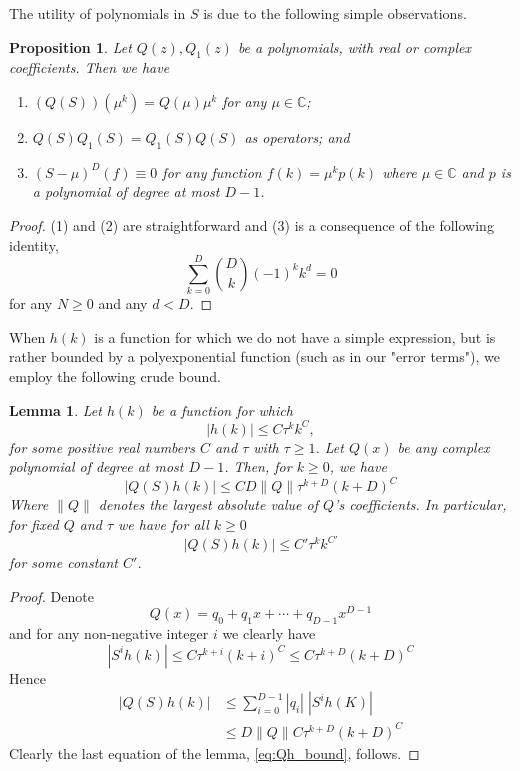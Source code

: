 \documentclass{memo-l}
\theoremstyle{plain}
\theoremstyle{definition}
\numberwithin{section}{chapter}
\numberwithin{equation}{chapter}
\theoremstyle{plain}
\newtheorem{prop}[theorem]{Proposition}
\newtheorem{lem}[theorem]{Lemma}
\theoremstyle{definition}
\newcommand\CC{\mathbb{C}}
\begin{document}
The utility of polynomials in \(S\) is due to the following simple
observations.

\begin{prop} 
\label{pr:basic-facts-shift}
Let \( Q(z),Q_1(z) \) be a polynomials, with real
or complex coefficients.  Then we have
\begin{enumerate}[label= (\arabic*)] 
\item \( (Q(S))(\mu^k) = Q(\mu) \mu^k
\) for any \( \mu \in \CC \); 
\item $Q(S)Q_1(S)=Q_1(S)Q(S)$ as operators; and
\item \(
(S-\mu)^D(f) \equiv 0 \) for any function \( f(k) = \mu^k p(k) \) where \(
\mu \in \CC \) and \( p \) is a polynomial of degree at most \( D-1 \).
\end{enumerate} \end{prop} \begin{proof} (1) and (2) are straightforward
and (3) is a consequence of the following identity, \[ \sum_{k=0}^D
\binom{D}{k} (-1)^k k^d = 0 \] for any \( N \geq 0 \) and any \( d < D \).
\end{proof}


When \(h(k)\) is a function for which we do not have a simple expression,
but is rather bounded by a polyexponential function (such as in our "error
terms"), we employ the following crude bound.  \begin{lem} \label{le:crude}
Let \(h(k)\) be a function for which \[ |h(k)| \leq C \tau^k k^C, \] for
some positive real numbers \(C\) and \(\tau\) with \(\tau\geq 1\). Let
\(Q(x)\) be any complex polynomial of degree at most \(D-1\).  Then, for \(
k \geq 0 \), we have \[ |Q(S)h(k)| \leq C D \|Q\| \tau^{k+D}(k+D)^C \]
Where \(\|Q\|\) denotes the largest  absolute value of \(Q\)'s
coefficients. In particular, for fixed \(Q\) and \(\tau\) we have for all
\( k \geq 0 \) \begin{equation}\label{eq:Qh_bound} |Q(S)h(k)| \leq C'
\tau^k k^{C'} \end{equation} for some constant \( C' \).  \end{lem}
\begin{proof} Denote \[ Q(x) = q_0 + q_1 x + \cdots + q_{D-1} x^{D-1} \]
and for any non-negative integer \(i\) we clearly have \[ |S^i h(k) | \leq
C\tau^{k+i} (k+i)^C \leq C \tau^{k+D} (k+D)^C \] Hence \begin{align*} |Q(S)
h(k) | &\leq \sum_{i=0}^{D-1} | q_i | \; |S^i h(K) | \\ &\leq D\|Q\| C
\tau^{k+D} (k+D)^C \end{align*} Clearly the last equation of the lemma,
\eqref{eq:Qh_bound}, follows.  \end{proof}
%
%
%
%
\end{document}

